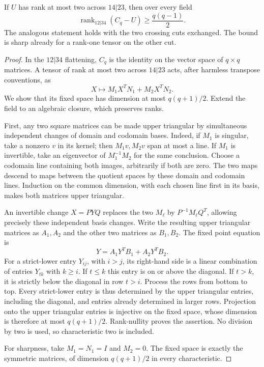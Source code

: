 \begin{lemma}
\label{pg:crosscut-residual}
If $U$ has rank at most two across $14|23$, then over every field
\[
 \operatorname{rank}_{12|34}(C_q-U)\geq\frac{q(q-1)}2.
\]
The analogous statement holds with the two crossing cuts exchanged.
The bound is sharp already for a rank-one tensor on the other cut.
\end{lemma}
\begin{proof}
In the $12|34$ flattening, $C_q$ is the identity on the vector
space of $q\times q$ matrices. A tensor of rank at most two
across $14|23$ acts, after harmless transpose conventions, as
\[
 X\longmapsto M_1X^TN_1+M_2X^TN_2.
\]
We show that its fixed space has dimension at most $q(q+1)/2$.
Extend the field to an algebraic closure, which preserves ranks.

First, any two square matrices can be made upper triangular by
simultaneous independent changes of domain and codomain bases.
Indeed, if $M_1$ is singular, take a nonzero $v$ in its kernel;
then $M_1v,M_2v$ span at most a line. If $M_1$ is invertible,
take an eigenvector of $M_1^{-1}M_2$ for the same conclusion.
Choose a codomain line containing both images, arbitrarily if
both are zero. The two maps descend to maps between the quotient
spaces by these domain and codomain lines. Induction on the
common dimension, with each chosen line first in its basis,
makes both matrices upper triangular.

An invertible change $X=P Y Q$ replaces the two $M_\ell$ by
$P^{-1}M_\ell Q^T$, allowing precisely these independent basis
changes. Write the resulting upper triangular matrices as
$A_1,A_2$ and the other two matrices as $B_1,B_2$. The fixed
point equation is
\[
 Y=A_1Y^TB_1+A_2Y^TB_2.
\]
For a strict-lower entry $Y_{ij}$, with $i>j$, its right-hand
side is a linear combination of entries $Y_{tk}$ with $k\geq i$.
If $t\leq k$ this entry is on or above the diagonal. If $t>k$,
it is strictly below the diagonal in row $t>i$. Process the
rows from bottom to top. Every strict-lower entry is thus
determined by the upper triangular entries, including the
diagonal, and entries already determined in larger rows.
Projection onto the upper triangular entries is injective on
the fixed space, whose dimension is therefore at most
$q(q+1)/2$. Rank-nullity proves the assertion. No division by
two is used, so characteristic two is included.

For sharpness, take $M_1=N_1=I$ and $M_2=0$. The fixed space is
exactly the symmetric matrices, of dimension $q(q+1)/2$ in every
characteristic.
\end{proof}

